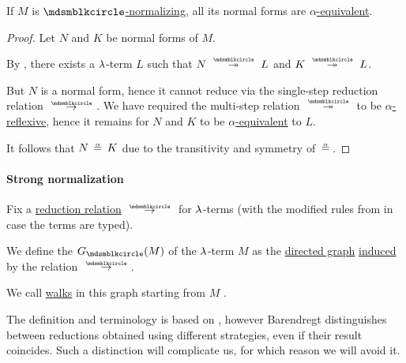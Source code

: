 \begin{proposition}\label{thm:lambda_reduction_normal_form_uniqueness}
  If \( M \) is \hyperref[def:lambda_reduction_normal_form]{\( \Anon \)-normalizing}, all its normal forms are \hyperref[def:lambda_term_alpha_equivalence]{\( \alpha \)-equivalent}.
\end{proposition}
\begin{proof}
  Let \( N \) and \( K \) be normal forms of \( M \).

  By , there exists a \( \mathrm{\lambda} \)-term \( L \) such that \( N \pred* L \) and \( K \pred* L \).

  But \( N \) is a normal form, hence it cannot reduce via the single-step reduction relation \( {\pred} \). We have required the multi-step relation \( {\pred*} \) to be \hyperref[def:alpha_reflexive]{\( \alpha \)-reflexive}, hence it remains for \( N \) and \( K \) to be \hyperref[def:lambda_term_alpha_equivalence]{\( \alpha \)-equivalent} to \( L \).

  It follows that \( N \aequiv K \) due to the transitivity and symmetry of \( {\aequiv} \).
\end{proof}

\paragraph{Strong normalization}

\begin{definition}\label{def:lambda_term_reduction_graph}\mimprovised
  Fix a \hyperref[def:lambda_reduction]{reduction relation} \( {\pred} \) for \( \mathrm{\lambda} \)-terms (with the modified rules from  in case the terms are typed).

  We define the  \( G_{\Anon}(M) \) of the \( \mathrm{\lambda} \)-term \( M \) as the \hyperref[def:directed_graph]{directed graph} \hyperref[def:directed_graph_induced_by_relation]{induced} by the relation \( {\pred} \).

  We call \hyperref[def:graph_walk/walk]{walks} in this graph starting from \( M \) .
\end{definition}
\begin{comments}
  \item The definition and terminology is based on , however Barendregt distinguishes between reductions obtained using different strategies, even if their result coincides. Such a distinction will complicate us, for which reason we will avoid it.
\end{comments}


